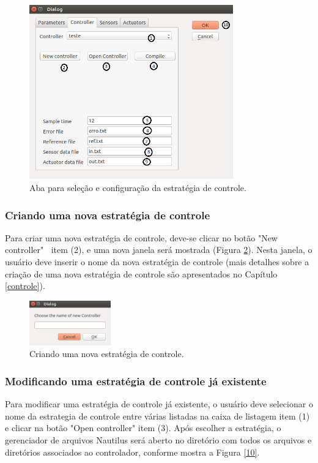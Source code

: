 \begin{figure}[!ht]
	\centering
	\includegraphics[width=250pt]{figuras/5_2.png}
	\caption{Aba para seleção e configuração da estratégia de controle.}
	\label{5}
\end{figure}

\subsubsection{Criando uma nova estratégia de controle}

Para criar uma nova estratégia de controle, deve-se clicar no botão "New controller" $~$ item (2), e uma nova janela será mostrada (Figura \ref{9}). Nesta janela, o usuário deve inserir o nome da nova estratégia de controle (mais detalhes sobre a criação de uma nova estratégia de controle são apresentados no Capítulo \ref{controle}).

\begin{figure}[!ht]
	\centering
	\includegraphics[width=100pt]{figuras/9.png}
	\caption{Criando uma nova estratégia de controle.}
	\label{9}
\end{figure}

\subsubsection{Modificando uma estratégia de controle já existente}

Para modificar uma estratégia de controle já existente, o usuário deve selecionar o nome da estrategia de controle entre várias listadas na caixa de listagem item (1) e clicar na botão "Open controller" item (3). Após escolher a estratégia, o gerenciador de arquivos Nautilus será aberto no diretório com todos os arquivos e diretórios associados ao controlador, conforme mostra a Figura \ref{10}.

